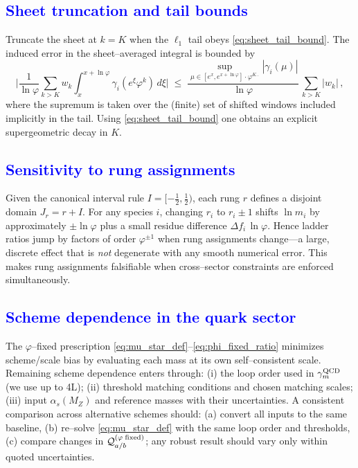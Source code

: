 \documentclass[%
 amsmath,amssymb,
 aps,
prb,
floatfix, showkeys
]{revtex4-2}
\newcommand{\modif}[1]{\textcolor{blue}{#1}}
\begin{document}
{\modif{
\subsection{Sheet truncation and tail bounds}
\label{subsec:error_sheet}
}}
Truncate the sheet at $k=K$ when the $\ell_1$ tail obeys \eqref{eq:sheet_tail_bound}.
The induced error in the sheet--averaged integral is bounded by
\begin{equation}
  \biggl|\frac{1}{\ln\varphi}\sum_{k>K}\! w_k \int_x^{x+\ln\varphi}\gamma_i(e^\xi \varphi^{k})\,d\xi \biggr|
  \;\le\; \frac{\sup_{\mu\in[e^x,e^{x+\ln\varphi}]\cdot\varphi^{K..}}|\gamma_i(\mu)|}{\ln\varphi}\,\sum_{k>K}|w_k|\,,
  \label{eq:sheet_trunc_error}
\end{equation}
where the supremum is taken over the (finite) set of shifted windows included implicitly in the tail. Using \eqref{eq:sheet_tail_bound} one obtains an explicit supergeometric decay in $K$.







{\modif{
\subsection{Sensitivity to rung assignments}
\label{subsec:error_rungs}
}}
Given the canonical interval rule $I=[-\tfrac{1}{2},\tfrac{1}{2})$, each rung $r$ defines a disjoint domain $J_r=r+I$. For any species $i$, changing $r_i$ to $r_i\pm 1$ shifts $\ln \widehat m_i$ by approximately $\pm \ln\varphi$ plus a small residue difference $\Delta f_i\,\ln\varphi$. Hence ladder ratios jump by factors of order $\varphi^{\pm 1}$ when rung assignments change---a large, discrete effect that is \emph{not} degenerate with any smooth numerical error. This makes rung assignments falsifiable when cross--sector constraints are enforced simultaneously.







  {\modif{
\subsection{Scheme dependence in the quark sector}
\label{subsec:error_schemes}
}}
The $\varphi$--fixed prescription \eqref{eq:mu_star_def}–\eqref{eq:phi_fixed_ratio} minimizes scheme/scale bias by evaluating each mass at its own self--consistent scale. Remaining scheme dependence enters through:
(i) the loop order used in $\gamma_m^{\rm QCD}$ (we use up to 4L);
(ii) threshold matching conditions and chosen matching scales;
(iii) input $\alpha_s(M_Z)$ and reference masses with their uncertainties.
A consistent comparison across alternative schemes should:
(a) convert all inputs to the same baseline,
(b) re--solve \eqref{eq:mu_star_def} with the same loop order and thresholds,
(c) compare changes in $\mathcal{Q}_{a/b}^{(\varphi{\rm\;fixed})}$; any robust result should vary only within quoted uncertainties.
\end{document}
